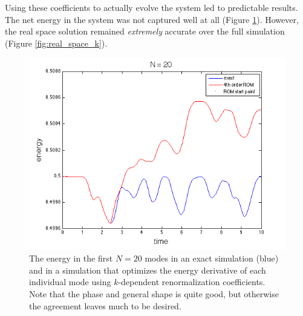 \documentclass{article}
\begin{document}
Using these coefficients to actually evolve the system led to predictable results. The net energy in the system was not captured well at all (Figure \ref{fig:k_dependent_evolution}). However, the real space solution remained \emph{extremely} accurate over the full simulation (Figure \ref{fig:real_space_k}).

\begin{figure}[h]
\includegraphics[width=\textwidth]{k_dependent_20_energy.png}
\caption{The energy in the first $N=20$ modes in an exact simulation (blue) and in a simulation that optimizes the energy derivative of each individual mode using $k$-dependent renormalization coefficients. Note that the phase and general shape is quite good, but otherwise the agreement leaves much to be desired.}\label{fig:k_dependent_evolution}
\end{figure}
\end{document}
